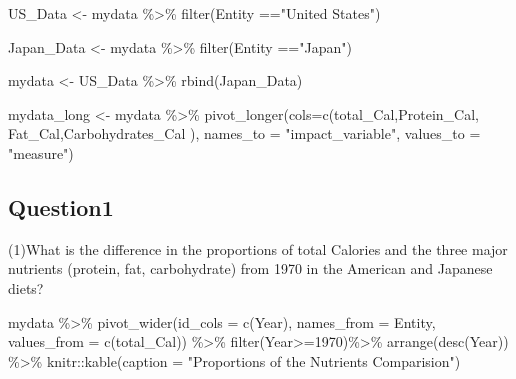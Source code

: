 \documentclass[11pt,a4paper,]{article}
\newenvironment{Shaded}{\begin{snugshade}}{\end{snugshade}}
\newcommand{\AttributeTok}[1]{\textcolor[rgb]{0.77,0.63,0.00}{#1}}
\newcommand{\DecValTok}[1]{\textcolor[rgb]{0.00,0.00,0.81}{#1}}
\newcommand{\FunctionTok}[1]{\textcolor[rgb]{0.00,0.00,0.00}{#1}}
\newcommand{\NormalTok}[1]{#1}
\newcommand{\OtherTok}[1]{\textcolor[rgb]{0.56,0.35,0.01}{#1}}
\newcommand{\SpecialCharTok}[1]{\textcolor[rgb]{0.00,0.00,0.00}{#1}}
\newcommand{\StringTok}[1]{\textcolor[rgb]{0.31,0.60,0.02}{#1}}
\begin{document}
\begin{Shaded}
\begin{Highlighting}[]
\NormalTok{US\_Data }\OtherTok{\textless{}{-}}\NormalTok{ mydata }\SpecialCharTok{\%\textgreater{}\%} \FunctionTok{filter}\NormalTok{(Entity }\SpecialCharTok{==}\StringTok{"United States"}\NormalTok{) }

\NormalTok{Japan\_Data }\OtherTok{\textless{}{-}}\NormalTok{ mydata }\SpecialCharTok{\%\textgreater{}\%} \FunctionTok{filter}\NormalTok{(Entity }\SpecialCharTok{==}\StringTok{"Japan"}\NormalTok{)}

\NormalTok{mydata }\OtherTok{\textless{}{-}}\NormalTok{ US\_Data }\SpecialCharTok{\%\textgreater{}\%} \FunctionTok{rbind}\NormalTok{(Japan\_Data)}

\NormalTok{mydata\_long }\OtherTok{\textless{}{-}}\NormalTok{ mydata }\SpecialCharTok{\%\textgreater{}\%} 
  \FunctionTok{pivot\_longer}\NormalTok{(}\AttributeTok{cols=}\FunctionTok{c}\NormalTok{(total\_Cal,Protein\_Cal, Fat\_Cal,Carbohydrates\_Cal ),}
               \AttributeTok{names\_to =} \StringTok{"impact\_variable"}\NormalTok{, }\AttributeTok{values\_to =} \StringTok{"measure"}\NormalTok{)}
\end{Highlighting}
\end{Shaded}

\subsection*{Question1}

(1)What is the difference in the proportions of total Calories and the three major nutrients (protein, fat, carbohydrate) from 1970 in the American and Japanese diets?

\begin{Shaded}
\begin{Highlighting}[]
\NormalTok{mydata }\SpecialCharTok{\%\textgreater{}\%} 
  \FunctionTok{pivot\_wider}\NormalTok{(}\AttributeTok{id\_cols =} \FunctionTok{c}\NormalTok{(Year),}
              \AttributeTok{names\_from =}\NormalTok{ Entity,}
              \AttributeTok{values\_from =} \FunctionTok{c}\NormalTok{(total\_Cal)) }\SpecialCharTok{\%\textgreater{}\%}
  \FunctionTok{filter}\NormalTok{(Year}\SpecialCharTok{\textgreater{}=}\DecValTok{1970}\NormalTok{)}\SpecialCharTok{\%\textgreater{}\%}
  \FunctionTok{arrange}\NormalTok{(}\FunctionTok{desc}\NormalTok{(Year)) }\SpecialCharTok{\%\textgreater{}\%}
\NormalTok{  knitr}\SpecialCharTok{::}\FunctionTok{kable}\NormalTok{(}\AttributeTok{caption =} \StringTok{"Proportions of the Nutrients Comparision"}\NormalTok{)}
\end{Highlighting}
\end{Shaded}
\end{document}

